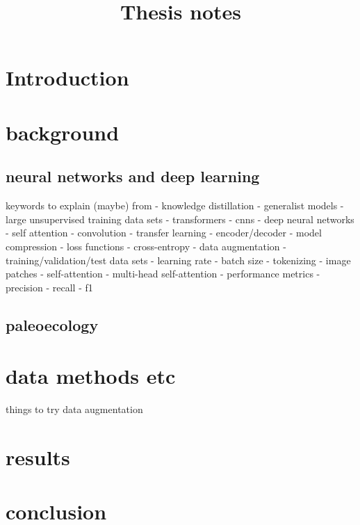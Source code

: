 \documentclass{article}
\title{Thesis notes}
\begin{document}
\tableofcontents

\section{Introduction}

\section{background}

\subsection{neural networks and deep learning}
keywords to explain (maybe) from \cite{li2021trocr}
- knowledge distillation
- generalist models
	- large unsupervised training data sets
- transformers
- cnns
- deep neural networks
- self attention
- convolution
- transfer learning
- encoder/decoder
- model compression
- loss functions
	- cross-entropy 
- data augmentation
- training/validation/test data sets
- learning rate
- batch size
- tokenizing
- image patches
- self-attention
- multi-head self-attention
- performance metrics
	- precision
	- recall 
	- f1

\subsection{paleoecology}

\section{data methods etc}

things to try
data augmentation

\section{results}

\section{conclusion}

\printbibliography
\end{document}
